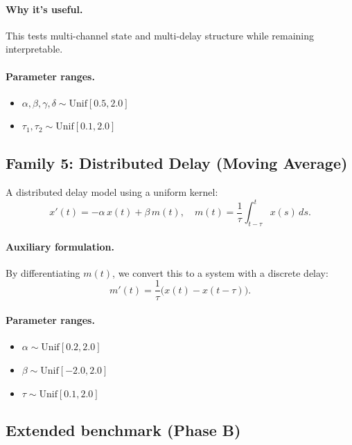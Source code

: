 \paragraph{Why it's useful.}
This tests multi-channel state and multi-delay structure while remaining interpretable.

\paragraph{Parameter ranges.}
\begin{itemize}
  \item $\alpha, \beta, \gamma, \delta \sim \mathrm{Unif}[0.5, 2.0]$
  \item $\tau_1, \tau_2 \sim \mathrm{Unif}[0.1, 2.0]$
\end{itemize}

\subsection{Family 5: Distributed Delay (Moving Average)}

A distributed delay model using a uniform kernel:
\begin{equation}
  x'(t) = -\alpha \, x(t) + \beta \, m(t), \quad
  m(t) = \frac{1}{\tau} \int_{t-\tau}^{t} x(s) \, ds.
\end{equation}

\paragraph{Auxiliary formulation.}
By differentiating $m(t)$, we convert this to a system with a discrete delay:
\begin{equation}
  m'(t) = \frac{1}{\tau} \bigl( x(t) - x(t-\tau) \bigr).
\end{equation}

\paragraph{Parameter ranges.}
\begin{itemize}
  \item $\alpha \sim \mathrm{Unif}[0.2, 2.0]$
  \item $\beta \sim \mathrm{Unif}[-2.0, 2.0]$
  \item $\tau \sim \mathrm{Unif}[0.1, 2.0]$
\end{itemize}

\subsection{Extended benchmark (Phase B)}

